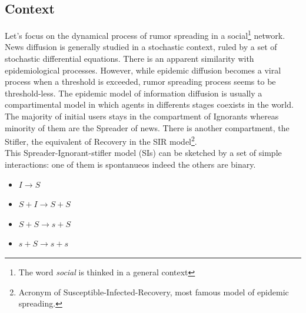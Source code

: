 \documentclass[11pt]{article} %
\begin{document}
\subsection{Context}
Let's focus on the dynamical process of rumor spreading in a social\footnote{The word \textit{ social} is thinked in a general context} network.
 News diffusion is generally studied in a stochastic context, ruled by a set of stochastic differential equations.
 There is an apparent similarity with  epidemiological processes. 
However, while epidemic diffusion becomes a viral process when a threshold is exceeded, rumor spreading process seems to be threshold-less.
 The epidemic model of information diffusion is usually a compartimental model in which agents in differents stages coexists in the world.
The majority of initial users stays in the compartment of Ignorants whereas minority of them are the Spreader of news.
 There is another compartment, the Stifler, the equivalent of Recovery in the SIR model\footnote{Acronym of Susceptible-Infected-Recovery, most famous model of epidemic spreading.}. 
\\ This Spreader-Ignorant-stifler model (SIs) can be sketched by a set of simple interactions: one of them is spontanueos indeed the others are binary.
\begin{itemize}
\item$ I \longrightarrow S$
\item $S+I \longrightarrow S + S$

\item $S + S \longrightarrow s + S$

\item $s + S \longrightarrow  s + s$
\end{itemize}
\end{document}
